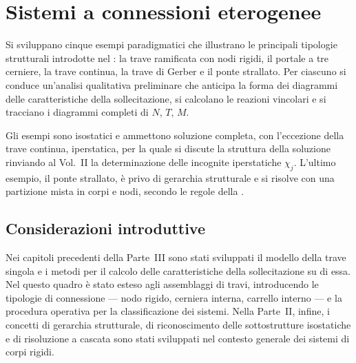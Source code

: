 \graphicspath{{Parti/P04-Travi_rigide/C04_Sistemi_connessioni_eterogenee/Figure/}}
\chapter{Sistemi a connessioni eterogenee}
\label{cap:sistemi_conn_eterogenee}


\begin{sommario}
	Si sviluppano cinque esempi paradigmatici che illustrano
	le principali tipologie strutturali introdotte nel
	: la trave ramificata con
	nodi rigidi, il portale a tre cerniere, la trave continua,
	la trave di Gerber e il ponte strallato. Per ciascuno si
	conduce un'analisi qualitativa preliminare che anticipa la
	forma dei diagrammi delle caratteristiche della
	sollecitazione, si calcolano le reazioni vincolari e si
	tracciano i diagrammi completi di $N$, $T$, $M$.
	
	Gli esempi sono isostatici e ammettono soluzione completa,
	con l'eccezione della trave continua, iperstatica, per la
	quale si discute la struttura della soluzione rinviando al
	Vol.~II la determinazione delle incognite iperstatiche
	$\chi_j$. L'ultimo esempio, il ponte strallato, è privo di
	gerarchia strutturale e si risolve con una partizione mista
	in corpi e nodi, secondo le regole della
	.
\end{sommario}


\section*{Considerazioni introduttive}
\label{sec:raccordo_eterogenei}

Nei capitoli precedenti della Parte~III sono stati
sviluppati il modello della trave singola e i metodi
per il calcolo delle caratteristiche della sollecitazione
su di essa. Nel  questo
quadro è stato esteso agli assemblaggi di travi,
introducendo le tipologie di connessione --- nodo rigido,
cerniera interna, carrello interno --- e la procedura
operativa per la classificazione dei sistemi. Nella
Parte~II, infine, i concetti di gerarchia strutturale,
di riconoscimento delle sottostrutture isostatiche e di
risoluzione a cascata sono stati sviluppati nel contesto
generale dei sistemi di corpi rigidi.

